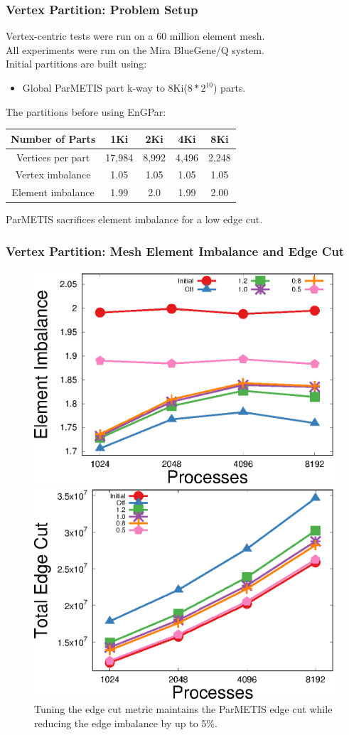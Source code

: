 \documentclass[aspectratio=169]{beamer}
\begin{document}
\begin{frame}
  \frametitle{Vertex Partition: Problem Setup}
  \medskip
  Vertex-centric tests were run on a 60 million element mesh. \\
  All experiments were run on the Mira BlueGene/Q system. \\
  \smallskip
  Initial partitions are built using:
  \begin{itemize}
  \item Global ParMETIS part k-way to 8Ki($8*2^{10}$) parts.
  \end{itemize}
  The partitions before using EnGPar: \\
  \begin{table}[!h]
    \centering
    \begin{tabular}{||c|c|c|c|c||}
      \hline
      Number of Parts   & 1Ki   & 2Ki   & 4Ki   & 8Ki \\
      \hline
      Vertices per part & 17,984 & 8,992 & 4,496 & 2,248 \\
      \hline
      Vertex imbalance  & 1.05  & 1.05  & 1.05  & 1.05 \\
      \hline
      Element imbalance & 1.99  & 2.0  & 1.99  & 2.00 \\
      \hline
    \end{tabular}
  \end{table}
  ParMETIS sacrifices element imbalance for a low edge cut.
\end{frame}

\begin{frame}
  \frametitle{Vertex Partition: Mesh Element Imbalance and Edge Cut}
  \begin{figure}
    \centering
    \includegraphics[width=.48\textwidth]{../accelerated_cse19/figures/eimb_v_cores.eps}
    \includegraphics[width=.48\textwidth]{../accelerated_cse19/figures/ecut_v_cores.eps}\\
    Tuning the edge cut metric maintains the ParMETIS edge cut while reducing the
    edge imbalance by up to 5\%.
  \end{figure}  
\end{frame}
\end{document}
